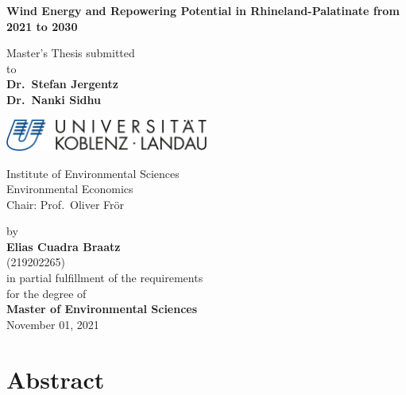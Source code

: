 \documentclass[a4paper,11pt]{article}
\begin{document}
\thispagestyle{empty}
\begin{center}
  \vspace*{5mm}
  \linespread{1.5}
  {\huge{\bf Wind Energy and Repowering Potential in Rhineland-Palatinate from 2021 to 2030}\par}\vspace{1cm}
  Master's Thesis submitted \\\vspace{0.5cm}
  to \\\vspace{0.5cm}
  \textbf{Dr.~Stefan Jergentz} \\
  \textbf{Dr.~Nanki Sidhu} \\\vspace{1.5cm}
  
  
  \includegraphics[width=0.5\textwidth]{Uni-Logo-2.jpg}
  
  Institute of Environmental Sciences \\
  Environmental Economics \\
   Chair: Prof.~Oliver Frör \\  \vspace{1cm}

  
  
  by \\\vspace{0.5cm}
  \textbf{Elias Cuadra Braatz} \\
  (219202265) \\
  
  \medskip
  \medskip
  in partial fulfillment of the requirements \\
  for the degree of \\
  \textbf{Master of Environmental Sciences} \\\vspace{0.5cm}
  November 01, 2021
  
\end{center}


\newpage
\tableofcontents
\clearpage

\newpage
\hypertarget{abstract}{%
\section*{Abstract}\label{abstract}}
\end{document}
